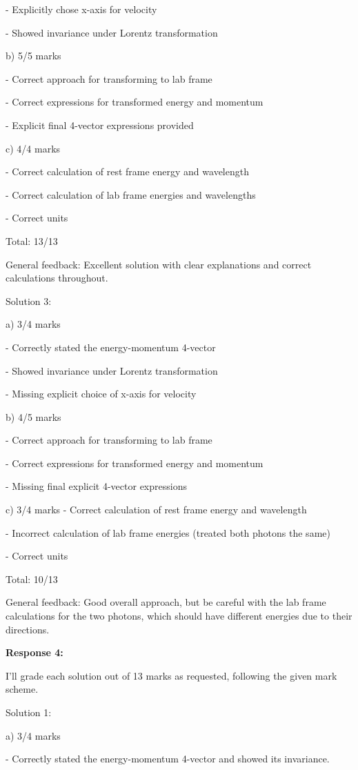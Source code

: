 \documentclass[a4paper,11pt]{article}
\begin{document}
- Explicitly chose x-axis for velocity

- Showed invariance under Lorentz transformation

b) 5/5 marks

- Correct approach for transforming to lab frame

- Correct expressions for transformed energy and momentum

- Explicit final 4-vector expressions provided

c) 4/4 marks

- Correct calculation of rest frame energy and wavelength

- Correct calculation of lab frame energies and wavelengths

- Correct units

Total: 13/13

General feedback: Excellent solution with clear explanations and correct calculations throughout.

Solution 3:

a) 3/4 marks

- Correctly stated the energy-momentum 4-vector

- Showed invariance under Lorentz transformation

- Missing explicit choice of x-axis for velocity

b) 4/5 marks

- Correct approach for transforming to lab frame

- Correct expressions for transformed energy and momentum

- Missing final explicit 4-vector expressions

c) 3/4 marks
- Correct calculation of rest frame energy and wavelength

- Incorrect calculation of lab frame energies (treated both photons the same)

- Correct units

Total: 10/13

General feedback: Good overall approach, but be careful with the lab frame calculations for the two photons, which should have different energies due to their directions.

\bigskip
\textbf{Response 4:}

I'll grade each solution out of 13 marks as requested, following the given mark scheme.

Solution 1:

a) 3/4 marks

- Correctly stated the energy-momentum 4-vector and showed its invariance.
\end{document}

